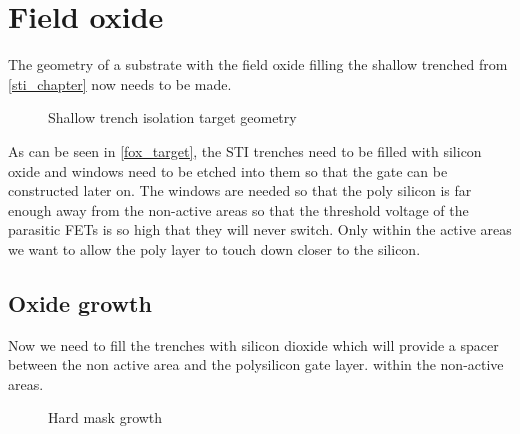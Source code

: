\section{Field oxide}\label{fox_chapter}

The geometry of a substrate with the field oxide filling the shallow trenched from \autoref{sti_chapter} now needs to be made.

\begin{figure}[H]
	\centering
	\begin{tikzpicture}[node distance = 3cm, auto, thick,scale=\CrossAndTopSectionBig, every node/.style={transform shape}]
		
	\end{tikzpicture}
	\begin{tikzpicture}[node distance = 3cm, auto, thick,scale=\CrossAndTopSectionBig, every node/.style={transform shape}]
		
	\end{tikzpicture}
	\caption{Shallow trench isolation target geometry}
	\label{fox_target}
\end{figure}

As can be seen in \autoref{fox_target}, the STI trenches need to be filled with silicon oxide and windows need to be etched into them so that the gate can be constructed later on.
The windows are needed so that the poly silicon is far enough away from the non-active areas so that the threshold voltage of the parasitic FETs is so high that they will never switch.
Only within the active areas we want to allow the poly layer to touch down closer to the silicon.

\newpage

\subsection{Oxide growth}
Now we need to fill the trenches with silicon dioxide which will provide a spacer between the non active area and the polysilicon gate layer. within the non-active areas.

\begin{figure}[H]
	\centering
	\begin{tikzpicture}[node distance = 3cm, auto, thick,scale=\CrossSectionOnly, every node/.style={transform shape}]
		
	\end{tikzpicture}
	\drawStepArrow{}
	\begin{tikzpicture}[node distance = 3cm, auto, thick,scale=\CrossSectionOnly, every node/.style={transform shape}]
		
	\end{tikzpicture}
	\caption{Hard mask growth}
\end{figure}

